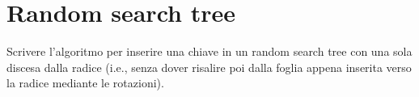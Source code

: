 \chapter{Random search tree}

\begin{problem*}
  Scrivere l'algoritmo per inserire una chiave in un random search tree
  con una sola discesa dalla radice (i.e., senza dover risalire poi dalla
  foglia appena inserita verso la radice mediante le rotazioni).
\end{problem*}

